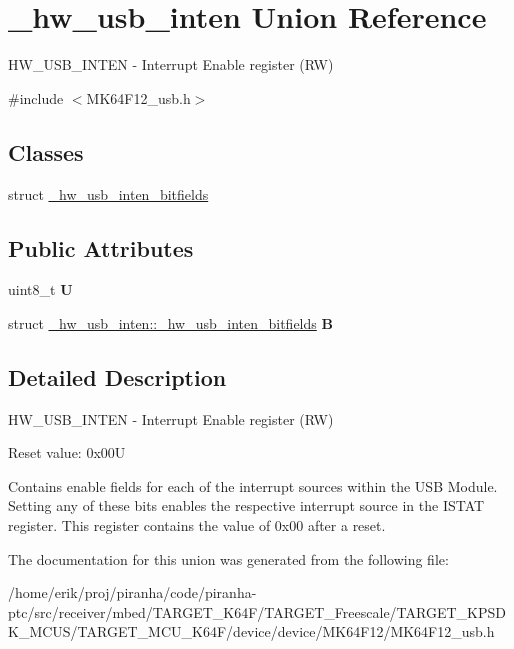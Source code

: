 \hypertarget{union__hw__usb__inten}{}\section{\+\_\+hw\+\_\+usb\+\_\+inten Union Reference}
\label{union__hw__usb__inten}


H\+W\+\_\+\+U\+S\+B\+\_\+\+I\+N\+T\+EN -\/ Interrupt Enable register (RW)  




{\ttfamily \#include $<$M\+K64\+F12\+\_\+usb.\+h$>$}

\subsection*{Classes}
\begin{DoxyCompactItemize}
\item 
struct \hyperlink{struct__hw__usb__inten_1_1__hw__usb__inten__bitfields}{\+\_\+hw\+\_\+usb\+\_\+inten\+\_\+bitfields}
\end{DoxyCompactItemize}
\subsection*{Public Attributes}
\begin{DoxyCompactItemize}
\item 
uint8\+\_\+t {\bfseries U}\hypertarget{union__hw__usb__inten_a5af45cdfb2a206a0ddb7c5464cb1d09a}{}\label{union__hw__usb__inten_a5af45cdfb2a206a0ddb7c5464cb1d09a}

\item 
struct \hyperlink{struct__hw__usb__inten_1_1__hw__usb__inten__bitfields}{\+\_\+hw\+\_\+usb\+\_\+inten\+::\+\_\+hw\+\_\+usb\+\_\+inten\+\_\+bitfields} {\bfseries B}\hypertarget{union__hw__usb__inten_ad80a4c4490ae0b7988b3f5073bc51932}{}\label{union__hw__usb__inten_ad80a4c4490ae0b7988b3f5073bc51932}

\end{DoxyCompactItemize}


\subsection{Detailed Description}
H\+W\+\_\+\+U\+S\+B\+\_\+\+I\+N\+T\+EN -\/ Interrupt Enable register (RW) 

Reset value\+: 0x00U

Contains enable fields for each of the interrupt sources within the U\+SB Module. Setting any of these bits enables the respective interrupt source in the I\+S\+T\+AT register. This register contains the value of 0x00 after a reset. 

The documentation for this union was generated from the following file\+:\begin{DoxyCompactItemize}
\item 
/home/erik/proj/piranha/code/piranha-\/ptc/src/receiver/mbed/\+T\+A\+R\+G\+E\+T\+\_\+\+K64\+F/\+T\+A\+R\+G\+E\+T\+\_\+\+Freescale/\+T\+A\+R\+G\+E\+T\+\_\+\+K\+P\+S\+D\+K\+\_\+\+M\+C\+U\+S/\+T\+A\+R\+G\+E\+T\+\_\+\+M\+C\+U\+\_\+\+K64\+F/device/device/\+M\+K64\+F12/M\+K64\+F12\+\_\+usb.\+h\end{DoxyCompactItemize}
